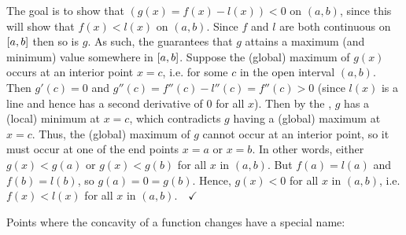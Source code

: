 The goal is to show that $\left(g(x) = f(x) - l(x)\right) < 0$ on
$(a,b)$, since this will show that $f(x) < l(x)$ on $(a,b)$. Since $f$
and $l$ are both continuous on $\lbrack a,b \rbrack$ then so is $g$. As such,
the  guarantees that $g$ attains
a maximum (and minimum) value somewhere in $\lbrack a,b \rbrack$. Suppose the
(global) maximum of $g(x)$ occurs at an interior point $x=c$, i.e. for
some $c$ in the open interval $(a,b)$. Then $g'(c)=0$ and
$g''(c)=f''(c)-l''(c)=f''(c)>0$ (since $l(x)$ is a line and hence has
a second derivative of $0$ for all $x$). Then by the
, $g$ has a (local)
minimum at $x=c$, which contradicts $g$ having a (global) maximum at
$x=c$. Thus, the (global) maximum of $g$ cannot occur at an interior
point, so it must occur at one of the end points $x=a$ or $x=b$. In
other words, either $g(x)<g(a)$ or $g(x)<g(b)$ for all $x$ in
$(a,b)$. But $f(a)=l(a)$ and $f(b)=l(b)$, so $g(a)=0=g(b)$. Hence,
$g(x)<0$ for all $x$ in $(a,b)$, i.e. $f(x) < l(x)$ for all $x$ in
$(a,b).  \quad\checkmark$\vspace{2mm}\\ \divider
\vspace{3mm}

Points where the concavity of a function changes have a special name:


